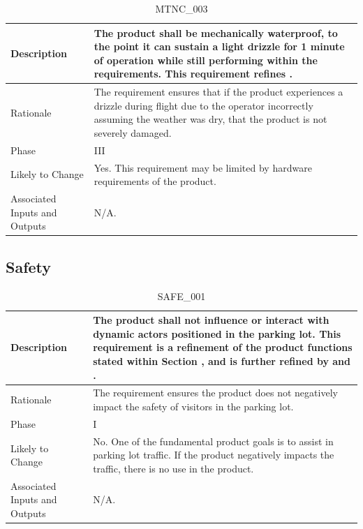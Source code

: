 \documentclass{article}
\begin{document}
\begin{table}[!h]
\begin{center}
\caption {MTNC\_003} 
\label{MTNC_003}
\begin{tabular}{ | m{3cm} | m{11cm} | }
\hline
Description & The product shall be mechanically waterproof, to the point it can sustain a light drizzle for 1 minute of operation while still performing within the requirements. This requirement refines \nameref{PERF_007}. \\
\hline
Rationale & The requirement ensures that if the product experiences a drizzle during flight due to the operator incorrectly assuming the weather was dry, that the product is not severely damaged. \\
\hline
Phase & III \\
\hline
Likely to Change & Yes. This requirement may be limited by hardware requirements of the product. \\
\hline
Associated Inputs and Outputs & N/A.  \\
\hline
\end{tabular}
\end{center}
\end{table}

\clearpage
\newpage

\subsection{Safety}
\begin{table}[!h]
\begin{center}
\caption {SAFE\_001} 
\label{SAFE_001}
\begin{tabular}{ | m{3cm} | m{11cm} | }
\hline
Description & The product shall not influence or interact with dynamic actors positioned in the parking lot. This requirement is a refinement of the product functions stated within Section \nameref{subsec:ProdFunc}, and is further refined by \nameref{SAFE_002} and \nameref{SAFE_004}. \\
\hline
Rationale & The requirement ensures the product does not negatively impact the safety of visitors in the parking lot.  \\
\hline
Phase & I \\
\hline
Likely to Change & No. One of the fundamental product goals is to assist in parking lot traffic. If the product negatively impacts the traffic, there is no use in the product. \\
\hline
Associated Inputs and Outputs & N/A.  \\
\hline
\end{tabular}
\end{center}
\end{table}
\end{document}
